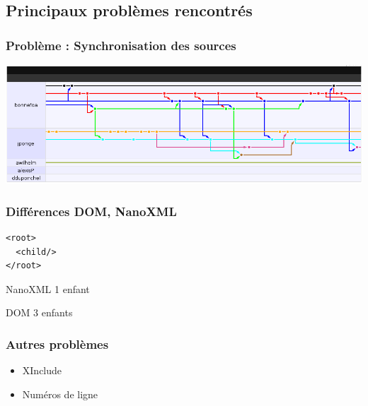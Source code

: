 \subsection{Principaux problèmes rencontrés}
\begin{frame}\frametitle{Problème : Synchronisation des sources}
\includegraphics[width=\linewidth]{../image/gitHubBranche.png}
\end{frame}
\begin{frame}[containsverbatim]\frametitle{Différences DOM, NanoXML}
\begin{centering}
\begin{minipage}[c]{.5\linewidth}
\begin{verbatim}
<root>
  <child/>
</root>
\end{verbatim}
\end{minipage}
\vfill
\begin{minipage}[c]{.4\linewidth}
	\begin{beamerboxesrounded}[shadow=true]{NanoXML}
		1  enfant
	\end{beamerboxesrounded}
\end{minipage}
\hfill
\begin{minipage}[c]{.4\linewidth}
	\begin{beamerboxesrounded}[shadow=true]{DOM}
		3  enfants
	\end{beamerboxesrounded}
\end{minipage}
\vfill
\end{centering}
\end{frame}
\begin{frame}\frametitle{Autres problèmes}
\begin{itemize}
 \item XInclude
 \item Numéros de ligne
\end{itemize}
\end{frame}
